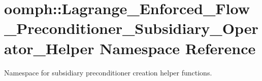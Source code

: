 \hypertarget{namespaceoomph_1_1Lagrange__Enforced__Flow__Preconditioner__Subsidiary__Operator__Helper}{}\section{oomph\+:\+:Lagrange\+\_\+\+Enforced\+\_\+\+Flow\+\_\+\+Preconditioner\+\_\+\+Subsidiary\+\_\+\+Operator\+\_\+\+Helper Namespace Reference}
\label{namespaceoomph_1_1Lagrange__Enforced__Flow__Preconditioner__Subsidiary__Operator__Helper}


Namespace for subsidiary preconditioner creation helper functions.  


